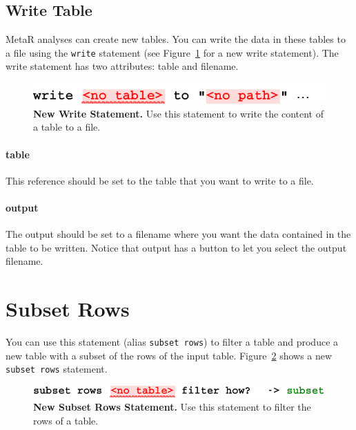 \subsection{Write Table}
MetaR analyses can create new tables. You can write the data in these tables to a file using the \texttt{write} statement (see Figure~\ref{fig:NewWriteTableStatement} for a new write statement). The write statement has two attributes: table and filename.
\begin{figure}
  \centering
  \includegraphics[width=\figWidthNarrow]{figures/NewWriteStatement.pdf}
\caption[New Write Statement	.]{\textbf{New Write Statement.} Use this statement to write the content of a table to a file.}
\label{fig:NewWriteTableStatement}
\end{figure}


\paragraph{table}
This reference should be set to the table that you want to write to a file.
\paragraph{output}
The output should be set to a filename where you want the data contained in the table to be written. Notice that output has a button to let you select the output filename.

\section{Subset Rows}
You can use this statement (alias \texttt{subset rows}) to filter a table and produce a new table with a subset of the rows of the input table. Figure~\ref{fig:NewSubsetRows} shows a new \texttt{subset rows} statement.

\begin{figure}
  \centering
  \includegraphics[width=\figWidthNarrow]{figures/NewSubsetRowsStatement.pdf}
\caption[New Subset Rows Statement.]{\textbf{New Subset Rows Statement.} Use this statement to filter the rows of a table.}
\label{fig:NewSubsetRows}
\end{figure}

